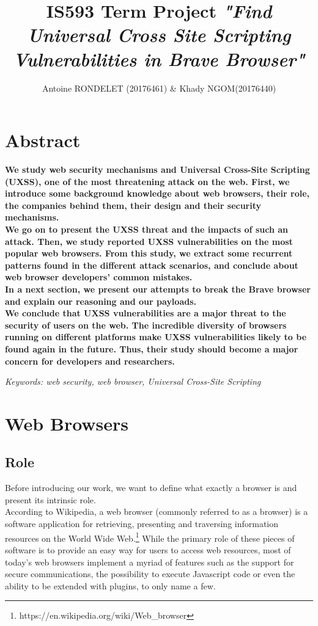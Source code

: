 \documentclass[journal]{IEEEtran}
\begin{document}
\title{IS593 Term Project \emph{"Find Universal Cross Site Scripting Vulnerabilities in Brave Browser"}}

\author{Antoine RONDELET (20176461) \& Khady NGOM(20176440)}
\maketitle
\IEEEpeerreviewmaketitle

\section*{Abstract}

\textbf{We study web security mechanisms and Universal Cross-Site Scripting (UXSS), one of the most threatening attack on the web. First, we introduce some background knowledge about web browsers, their role, the companies behind them, their design and their security mechanisms. \\
We go on to present the UXSS threat and the impacts of such an attack. Then, we study reported UXSS vulnerabilities on the most popular web browsers. From this study, we extract some recurrent patterns found in the different attack scenarios, and conclude about web browser developers' common mistakes.\\
In a next section, we present our attempts to break the Brave browser and explain our reasoning and our payloads. \\
We conclude that UXSS vulnerabilities are a major threat to the security of users on the web. The incredible diversity of browsers running on different platforms make UXSS vulnerabilities likely to be found again in the future. Thus, their study should become a major concern for developers and researchers.}

\bigskip

\emph{Keywords: web security, web browser, Universal Cross-Site Scripting}

\section{Web Browsers}

\subsection{Role}
Before introducing our work, we want to define what exactly a browser is and present its intrinsic role. \\
According to Wikipedia, a web browser (commonly referred to as a browser) is a software application for retrieving, presenting and traversing information resources on the World Wide Web.\footnote{https://en.wikipedia.org/wiki/Web\_browser}
While the primary role of these pieces of software is to provide an easy way for users to access web resources, most of today's web browsers implement a myriad of features such as the support for secure communications, the possibility to execute Javascript code or even the ability to be extended with plugins, to only name a few.
\end{document}
